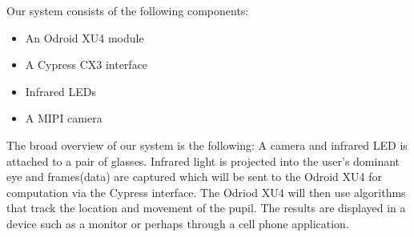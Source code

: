 Our system consists of the following components:
\begin{itemize}
	\item An Odroid XU4 module
	\item A Cypress CX3 interface
	\item Infrared LEDs
	\item A MIPI camera
 \end{itemize}
The broad overview of our system is the following:
A camera and infrared LED is attached to a pair of glasses. Infrared light is projected into the user's dominant eye and frames(data) are captured which will be sent to the Odroid XU4 for computation via the Cypress interface. The Odriod XU4 will then use algorithms that track the location and movement of the pupil. The results are displayed in a device such as a monitor or perhaps through a cell phone application. 
 
